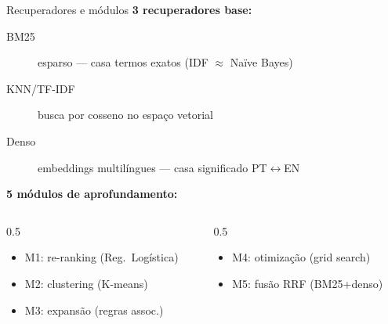 \documentclass{beamer}
\begin{document}
\begin{frame}{Recuperadores e módulos}
  \textbf{3 recuperadores base:}
  \begin{description}
    \item[BM25] esparso — casa termos exatos (IDF $\approx$ Naïve Bayes)
    \item[KNN/TF-IDF] busca por cosseno no espaço vetorial
    \item[Denso] embeddings multilíngues — casa significado PT$\leftrightarrow$EN
  \end{description}

  \vspace{0.8em}
  \textbf{5 módulos de aprofundamento:}
  \begin{columns}[T]
    \begin{column}{0.5\textwidth}
      \begin{itemize}
        \item M1: re-ranking (Reg.\ Logística)
        \item M2: clustering (K-means)
        \item M3: expansão (regras assoc.)
      \end{itemize}
    \end{column}
    \begin{column}{0.5\textwidth}
      \begin{itemize}
        \item M4: otimização (grid search)
        \item M5: fusão RRF (BM25+denso)
      \end{itemize}
    \end{column}
  \end{columns}
\end{frame}

\end{document}
